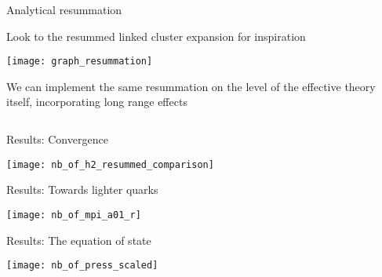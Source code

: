 \begin{frame}{Analytical resummation}

  Look to the \alert{resummed linked cluster expansion} for inspiration

  \vspace{1em}

  \begin{center}
    \texttt{[image: graph\_resummation]}
  \end{center}

  \vspace{.5em}

  We can implement the same resummation on the level of the effective theory
  itself, incorporating \alert{long range effects}

  \[
    
\]
  
\end{frame}

\begin{frame}{Results: Convergence}

  \begin{center}
    \texttt{[image: nb\_of\_h2\_resummed\_comparison]}
  \end{center}
  
\end{frame}

\begin{frame}{Results: Towards lighter quarks}

  \vspace{.5cm}

  \begin{center}\hspace*{-1cm}
    \texttt{[image: nb\_of\_mpi\_a01\_r]}
  \end{center}
  
\end{frame}

\begin{frame}{Results: The equation of state}

  \vspace{.25cm}
  \begin{center}
    \texttt{[image: nb\_of\_press\_scaled]}
  \end{center}
  
\end{frame}

